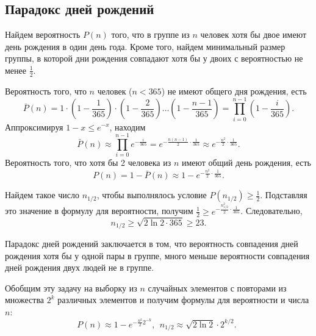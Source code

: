 \subsection{Парадокс дней рождений}

Найдем вероятность $P(n)$ того, что в группе из $n$ человек хотя бы двое имеют день рождения в один день года. Кроме того, найдем минимальный размер группы, в которой дни рождения совпадают хотя бы у двоих с вероятностью не менее $\frac{1}{2}$.

Вероятность того, что $n$ человек ($n < 365$) не имеют общего дня рождения, есть
\[
    \bar{P}(n) = 1 \cdot \left( 1 - \frac{1}{365} \right) \cdot \left(1 - \frac{2}{365} \right)  \dots  \left( 1 - \frac{n-1}{365} \right) = \prod\limits_{i=0}^{n-1} \left( 1 - \frac{i}{365} \right).
\]
Аппроксимируя $1-x \leq e^{-x}$, находим
    \[ \bar{P}(n) \approx \prod\limits_{i=0}^{n-1} e^{-\frac{i}{365}} = e^{-\frac{n(n-1)}{2} \cdot \frac{1}{365}} \approx e^{-\frac{n^2}{2} \cdot \frac{1}{365}}. \]
Вероятность того, что хотя бы 2 человека из $n$ имеют общий день рождения, есть
    \[ P(n) = 1 - \bar{P}(n) \approx 1 -  e^{-\frac{n^2}{2} \cdot \frac{1}{365}}. \]

Найдем такое число $n_{1/2}$, чтобы выполнялось условие $P(n_{1/2}) \geq \frac{1}{2}$. Подставляя это значение в формулу для вероятности,  получим $\frac{1}{2} \geq e^{-\frac{n_{1/2}^2}{2} \cdot \frac{1}{365}}$. Следовательно,
\[
    n_{1/2} \geq \sqrt{2 \ln 2 \cdot 365} \geq 23.
\]

Парадокс дней рождений заключается в том, что вероятность совпадения дней рождения хотя бы у одной пары в группе, много меньше вероятности совпадения дней рождения двух людей не в группе.


Обобщим эту задачу на выборку из $n$ случайных элементов с повторами из множества  $2^k$ различных элементов и получим формулы для вероятности и числа $n$:
\[
    P(n) \approx 1 -  e^{-\frac{n^2}{2} 2^{-k}}, ~~
    n_{1/2} \approx \sqrt{2 \ln 2} \cdot 2^{k/2}. ~~
\]
